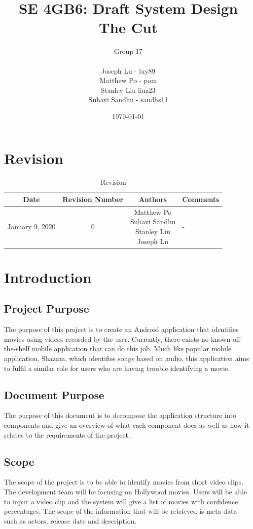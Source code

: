 \documentclass{article}
\title{SE 4GB6: Draft System Design\\The Cut}
\author{Group 17\\\\
            Joseph Lu - luy89 \\
            Matthew Po - pom \\
            Stanley Liu  liuz23 \\
            Suhavi Sandhu - sandhs11
            }
\date{\today}
\begin{document}
\maketitle
\newpage
\tableofcontents
\listoffigures
\listoftables
\newpage

\section{Revision}

\begin{table}[H]
    \caption{Revision}
    \centering
    \begin{tabularx}{\textwidth}{|c|c|c|X|}
        \hline
        Date & Revision Number & Authors & Comments \\ 
        \hline
        January 9, 2020 & 0 & \makecell{Matthew Po\\Suhavi Sandhu\\Stanley Liu\\Joseph Lu} & -\\ 
        \hline
    \end{tabularx}
    \label{tab:Revision}
\end{table}

\newpage

\section{Introduction}
 
\subsection{Project Purpose}
The purpose of this project is to create an Android application that identifies movies using videos recorded by the user. Currently, there exists no known off-the-shelf mobile application that can do this job. Much like popular mobile application, Shazam, which identifies songs based on audio, this application aims to fulfil a similar role for users who are having trouble identifying a movie.

\subsection{Document Purpose}
The purpose of this document is to decompose the application structure into components and give an overview of what each component does as well as how it relates to the requirements of the project.

\subsection{Scope}
The scope of the project is to be able to identify movies from short video clips. The development team will be focusing on Hollywood movies. Users will be able to input a video clip and the system will give a list of movies with confidence percentages. The scope of the information that will be retrieved is meta data such as actors, release date and description.
\end{document}
